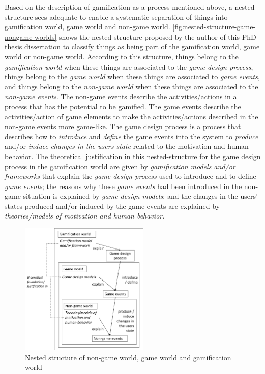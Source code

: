 Based on the description of gamification as a process mentioned above, a nested-structure sees adequate to enable a systematic separation of things into gamification world, game world and non-game world. \autoref{fig:nested-structure-game-nongame-worlds} shows the nested structure proposed by the author of this PhD thesis dissertation to classify things as being part of the gamification world, game world or non-game world. According to this structure, things belong to the \emph{gamification world} when these things are associated to the \emph{game design process}, things belong to the \emph{game world} when these things are associated to \emph{game events}, and things belong to the \emph{non-game world} when these things are associated to the \emph{non-game events}. The non-game events describe the activities/actions in a process that has the potential to be gamified. The game events describe the activities/action of game elements to make the activities/actions described in the non-game events more game-like. The game design process is a process that describes how to \emph{introduce} and \emph{define} the game events into the system to \emph{produce} and/or \emph{induce} \emph{changes in the users state} related to the motivation and human behavior. The theoretical justification in this nested-structure for the game design process in the gamification world are given by \emph{gamification models and/or frameworks} that explain the \emph{game design process} used to introduce and to define \emph{game events}; the reasons why these \emph{game events} had been introduced in the non-game situation is explained by \emph{game design models}; and the changes in the users' states produced and/or induced by the game events are explained by \emph{theories/models of motivation and human behavior}.

\begin{figure}[!htb]
 \caption{Nested structure of non-game world, game world and gamification world}
 \label{fig:nested-structure-game-nongame-worlds}
 \centering
 \includegraphics[width=0.55\textwidth]{images/chap-ontogacles2/nested-structure-game-nongame-worlds.png}
 \fautor
\end{figure}

